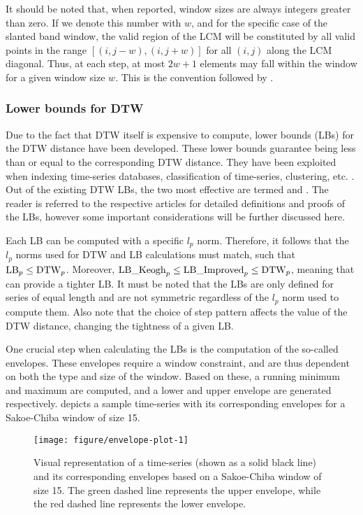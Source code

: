 It should be noted that, when reported, window sizes are always integers greater than zero.
If we denote this number with $w$,
and for the specific case of the slanted band window,
the valid region of the LCM will be constituted by all valid points in the range
$\left[ (i,j - w), (i, j + w) \right]$
for all $(i,j)$ along the LCM diagonal.
Thus, at each step, at most $2w + 1$ elements may fall within the window for a given window size $w$.
This is the convention followed by \dtwclust{}.

\subsubsection{Lower bounds for DTW}
\label{sec:lbs}

Due to the fact that DTW itself is expensive to compute,
lower bounds (LBs) for the DTW distance have been developed.
These lower bounds guarantee being less than or equal to the corresponding DTW distance.
They have been exploited when indexing time-series databases,
classification of time-series,
clustering,
etc. \citep{keogh2005, begum2015}.
Out of the existing DTW LBs,
the two most effective are termed  \citep{keogh2005} and  \citep{lemire2009}.
The reader is referred to the respective articles for detailed definitions and proofs of the LBs,
however some important considerations will be further discussed here.

Each LB can be computed with a specific $l_p$ norm.
Therefore, it follows that the $l_p$ norms used for DTW and LB calculations must match,
such that $\text{LB}_p \leq \text{DTW}_p{}$.
Moreover, $\text{LB\_Keogh}_p \leq \text{LB\_Improved}_p \leq \text{DTW}_p{}$,
meaning that  can provide a tighter LB.
It must be noted that the LBs are only defined for series of equal length and are not symmetric regardless of the $l_p$ norm used to compute them.
Also note that the choice of step pattern affects the value of the DTW distance,
changing the tightness of a given LB.

One crucial step when calculating the LBs is the computation of the so-called envelopes.
These envelopes require a window constraint,
and are thus dependent on both the type and size of the window.
Based on these, a running minimum and maximum are computed,
and a lower and upper envelope are generated respectively.
 depicts a sample time-series with its corresponding envelopes for a Sakoe-Chiba window of size 15.

\begin{figure}[htbp]

{\centering \texttt{[image: figure/envelope-plot-1]}

}

\caption{Visual representation of a time-series (shown as a solid black line) and its corresponding envelopes based on a Sakoe-Chiba window of size 15. The green dashed line represents the upper envelope, while the red dashed line represents the lower envelope.}\label{fig:envelope-plot}
\end{figure}

